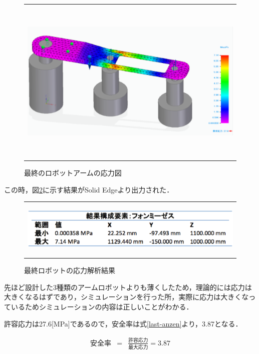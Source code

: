 \begin{figure}[htbp]
  \begin{center}
    \begin{tabular}{c}
      \includegraphics[height=8.0cm]{img/eps/last-ouryoku.eps}
    \end{tabular}
    \caption{最終のロボットアームの応力図}
    \label{last-ouryoku}
  \end{center}
\end{figure}

この時，図\ref{last-ouryoku-result}に示す結果がSolid
Edgeより出力された．

\begin{figure}[htbp]
  \begin{center}
    \begin{tabular}{c}
      \includegraphics[height=2.7cm]{img/eps/last-ouryoku-result.eps}
    \end{tabular}
    \caption{最終ロボットの応力解析結果}
    \label{last-ouryoku-result}
  \end{center}
\end{figure}

先ほど設計した3種類のアームロボットよりも薄くしたため，理論的には応力は大きくなるはずであり，シミュレーションを行った所，実際に応力は大きくなっているためシミュレーションの内容は正しいことがわかる．

許容応力は27.6{[}MPa{]}であるので，安全率は式\ref{last-anzen}より，3.87となる．

\begin{eqnarray}
  安全率 &=& \frac{許容応力}{最大応力} = 3.87
  \label{last-anzen}
\end{eqnarray}

